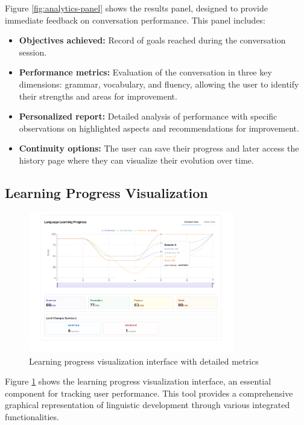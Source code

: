 Figure \ref{fig:analytics-panel} shows the results panel, designed to provide immediate feedback on conversation performance. This panel includes:

\begin{itemize}
    \item \textbf{Objectives achieved:} Record of goals reached during the conversation session.
    
    \item \textbf{Performance metrics:} Evaluation of the conversation in three key dimensions: grammar, vocabulary, and fluency, allowing the user to identify their strengths and areas for improvement.
    
    \item \textbf{Personalized report:} Detailed analysis of performance with specific observations on highlighted aspects and recommendations for improvement.
    
    \item \textbf{Continuity options:} The user can save their progress and later access the history page where they can visualize their evolution over time.
\end{itemize}

\subsection{Learning Progress Visualization}
\label{visualizacion-progreso}

\begin{figure}[H]
    \centering
    \includegraphics[width=0.8\textwidth]{figuras/screenshots/learning-history.png}
    \caption{Learning progress visualization interface with detailed metrics}
    \label{fig:learning-history}
\end{figure}

Figure \ref{fig:learning-history} shows the learning progress visualization interface, an essential component for tracking user performance. This tool provides a comprehensive graphical representation of linguistic development through various integrated functionalities.

